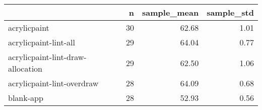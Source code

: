 \begin{tabular}{lrrr}
\toprule
{} &   n &  sample\_mean &  sample\_std \\
\midrule
acrylicpaint                      &  30 &        62.68 &        1.01 \\
acrylicpaint-lint-all             &  29 &        64.04 &        0.77 \\
acrylicpaint-lint-draw-allocation &  29 &        62.50 &        1.06 \\
acrylicpaint-lint-overdraw        &  28 &        64.09 &        0.68 \\
blank-app                         &  28 &        52.93 &        0.56 \\
\bottomrule
\end{tabular}
